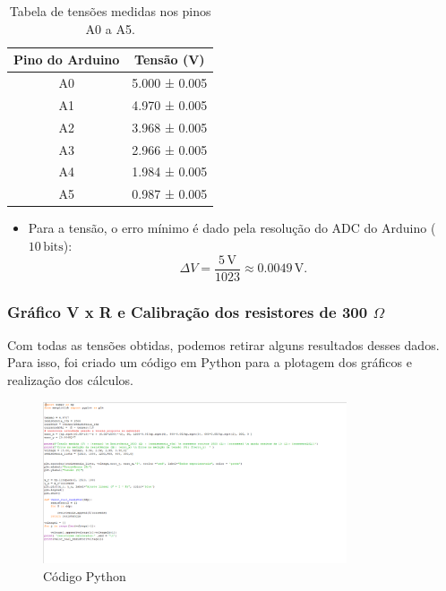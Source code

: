 \documentclass[a4paper,12pt]{article}
\begin{document}
\vspace{1em}
\begin{table}[ht]
    \centering
    \begin{tabular}{|c|c|}
        \hline
        Pino do Arduino & Tensão (V) \\
        \hline
        A0 & 5.000 ± 0.005 \\
        A1 & 4.970 ± 0.005 \\
        A2 & 3.968 ± 0.005 \\
        A3 & 2.966 ± 0.005 \\
        A4 & 1.984 ± 0.005 \\
        A5 & 0.987 ± 0.005 \\
        \hline
    \end{tabular}
    \caption{Tabela de tensões medidas nos pinos A0 a A5.}
    \label{tab:tensoes}
\end{table}

\begin{itemize}
    \item Para a tensão, o erro mínimo é dado pela resolução do ADC do Arduino ($10 \, \text{bits}$):
    \[
    \Delta V = \frac{5 \, \text{V}}{1023} \approx 0.0049 \, \text{V}.
    \]
\end{itemize}

\vspace{1em}

\subsubsection{Gráfico V x R e Calibração dos resistores de 300 \(\Omega\)}
\leavevmode

Com todas as tensões obtidas, podemos retirar alguns resultados desses dados. Para isso, foi criado um código em Python para a plotagem dos gráficos e realização dos cálculos.

\vspace{1em}

\begin{figure}[H]
    \centering
    \includegraphics[width=0.8\textwidth]{Código_exp1.png} %
    \caption{Código Python}
    \label{fig:tinkercad}
\end{figure}
\end{document}
